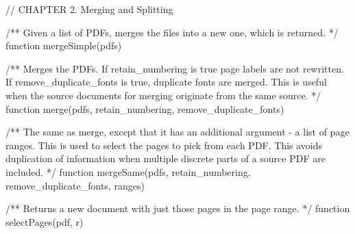 // CHAPTER 2. Merging and Splitting

/** Given a list of PDFs, merges the files into a new one, which is returned. */
function mergeSimple(pdfs)

/** Merges the PDFs. If retain_numbering is true page labels are not
rewritten. If remove_duplicate_fonts is true, duplicate fonts are merged.
This is useful when the source documents for merging originate from the same
source. */
function merge(pdfs, retain_numbering, remove_duplicate_fonts)

/** The same as merge, except that it has an additional argument - a list of
page ranges. This is used to select the pages to pick from each PDF. This
avoids duplication of information when multiple discrete parts of a source PDF
are included. */
function mergeSame(pdfs, retain_numbering, remove_duplicate_fonts, ranges)

/** Returns a new document with just those pages in the page range. */
function selectPages(pdf, r)
